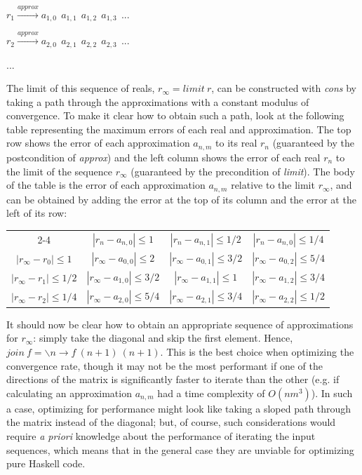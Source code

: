 $r_1 \xrightarrow{approx} a_{1,0}\ \ a_{1,1}\ \ a_{1,2}\ \ a_{1,3}\ \ ...$

$r_2 \xrightarrow{approx} a_{2,0}\ \ a_{2,1}\ \ a_{2,2}\ \ a_{2,3}\ \ ...$

...

The limit of this sequence of reals, $r_{\infty} = limit\ r$, can be constructed with \textit{cons} by taking a path through the approximations with a constant modulus of convergence. To make it clear how to obtain such a path, look at the following table representing the maximum errors of each real and approximation. The top row shows the error of each approximation $a_{n,m}$ to its real $r_{n}$ (guaranteed by the postcondition of \textit{approx}) and the left column shows the error of each real $r_{n}$ to the limit of the sequence $r_{\infty}$ (guaranteed by the precondition of \textit{limit}). The body of the table is the error of each approximation $a_{n,m}$ relative to the limit $r_{\infty}$, and can be obtained by adding the error at the top of its column and the error at the left of its row:

\begin{center}
\begin{tabular}{| c || c | c | c |} 
  \cline{2-4}
  \multicolumn{1}{c|}{}& $|r_n - a_{n,0}| \leq 1$ & $|r_n - a_{n,1}| \leq 1/2$ & $|r_n - a_{n,0}| \leq 1/4$ \\ [0.5ex]
  \hhline{|-|=|=|=|}
  $|r_{\infty} - r_0| \leq 1$ & $|r_{\infty} - a_{0,0}| \leq 2$ & $|r_{\infty} - a_{0,1}| \leq 3/2$ & $|r_{\infty} - a_{0,2}| \leq 5/4$ \\ 
  \hline
  $|r_{\infty} - r_1| \leq 1/2$ & $|r_{\infty} - a_{1,0}| \leq 3/2$ & $|r_{\infty} - a_{1,1}| \leq 1$ & $|r_{\infty} - a_{1,2}| \leq 3/4$ \\
  \hline
  $|r_{\infty} - r_2| \leq 1/4$ & $|r_{\infty} - a_{2,0}| \leq 5/4$ & $|r_{\infty} - a_{2,1}| \leq 3/4$ & $|r_{\infty} - a_{2,2}| \leq 1/2$ \\
  \hline
\end{tabular}
\end{center}

It should now be clear how to obtain an appropriate sequence of approximations for $r_{\infty}$: simply take the diagonal and skip the first element. Hence, $join \ f = \backslash n \rightarrow f \ (n+1) \ (n+1)$. This is the best choice when optimizing the convergence rate, though it may not be the most performant if one of the directions of the matrix is significantly faster to iterate than the other (e.g. if calculating an approximation $a_{n,m}$ had a time complexity of $O(nm^3)$). In such a case, optimizing for performance might look like taking a sloped path through the matrix instead of the diagonal; but, of course, such considerations would require \textit{a priori} knowledge about the performance of iterating the input sequences, which means that in the general case they are unviable for optimizing pure Haskell code.


